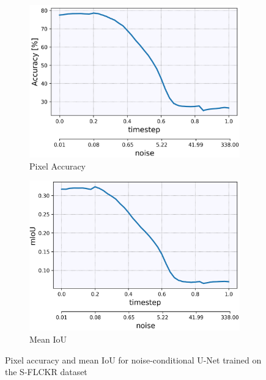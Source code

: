 %
%
\begin{figure}[] \label{5.14}
    \centering
    \begin{subfigure}[b]{0.49\textwidth}
        \centering
         \includegraphics[width=\textwidth]{Chapters/figures/experiments/flickr/flickr_acc.PNG}
         \caption{Pixel Accuracy}
    \end{subfigure}
    \begin{subfigure}[b]{0.49\textwidth}
        \centering
         \includegraphics[width=\textwidth]{Chapters/figures/experiments/flickr/flickr_mIoU.PNG}
         \caption{Mean IoU}
    \end{subfigure}
    \caption[Pixel accuracy and mIoU for U-Net on S-FLCKR dataset]{Pixel accuracy and mean IoU for noise-conditional U-Net trained on the S-FLCKR dataset}
\end{figure}
